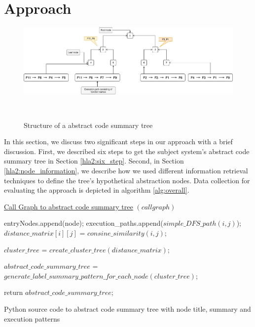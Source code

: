 \section{Approach}
\label{hla2:approach}
\begin{figure}[tb]
  \centering
  \includegraphics[width=\columnwidth]{figures/hla2/tree_structure.png}
  \caption{Structure of a abstract code summary tree}~\label{fig:tree_structure}
\end{figure}
In this section, we discuss two significant steps in our approach with a brief discussion. First, we described six steps to get the subject system's abstract code summary tree in Section \ref{hla2:six_step}. Second, in Section \ref{hla2:node_information}, we describe how we used different information retrieval techniques to define the tree's hypothetical abstraction nodes. Data collection for evaluating the approach is depicted in algorithm \ref{alg:overall}.


\begin{algorithm}
    
    \underline{Call Graph to abstract code summary tree} $(call graph)$\;
    
    {
        {
            entryNodes.append(node);
        }
    } 
    {
        {
            execution\_paths.append($simple\_DFS\_path(i, j)$);
        }
    }
    {
        {
            $distance\_matrix[i][j]$ = $consine\_similarity(i,j)$;
        }
    }
    
    $cluster\_tree$ = $create\_cluster\_tree(distance\_matrix)$;
    
    $abstract\_code\_summary\_tree$ = $generate\_label\_summary\_pattern\_for\_each\_node(cluster\_tree)$;
    
    return $abstract\_code\_summary\_tree$;
    \caption{Python source code to abstract code summary tree with node title, summary and execution patterns}
    \label{alg:overall}
\end{algorithm}

